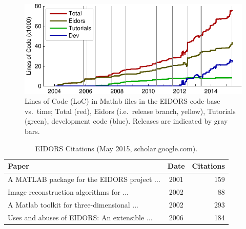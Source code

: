 \documentclass[portrait,final,a0paper,fontscale=0.277]{baposter}
\begin{document}
\begin{poster}
{\begin{figure}[H]
\centering
\includegraphics[width=.9\columnwidth]{../fig_loc.pdf}
\caption{\label{fig:loc}%
  \large
  Lines of Code (LoC) in Matlab files in the EIDORS code-base vs.\ time; Total
   (red), Eidors (i.e.\ release branch, yellow), Tutorials (green), development code (blue).
   Releases are indicated by gray bars.
}
\end{figure}

\begin{table}[H]
\centering
\vspace{-3mm}
\caption{\large\label{tbl:cite} EIDORS Citations
 (May 2015, scholar.google.com).
}
\begin{tabular}{lcr}
  \toprule
  Paper & Date & \hspace{-2mm}Citations \\
  \midrule
  \cite{vauhkonen2001} A MATLAB package for the EIDORS project {\tiny ...}  
    & 2001 & 159 \\
  \cite{polydorides2002phd} Image reconstruction algorithms for {\tiny ...}  
    & 2002 & 88 \\
  \cite{polydorides2002matlab} A Matlab toolkit for three-dimensional {\tiny ...}  
    & 2002 & 293 \\
  \cite{adler2006} Uses and abuses of {EIDORS}: An extensible {\tiny ...} 
    & 2006 & 184 \\
  \bottomrule
\end{tabular}
\vspace{-1em}
\end{table}
   \vspace{0.3em}
}


\end{poster}
\end{document}
